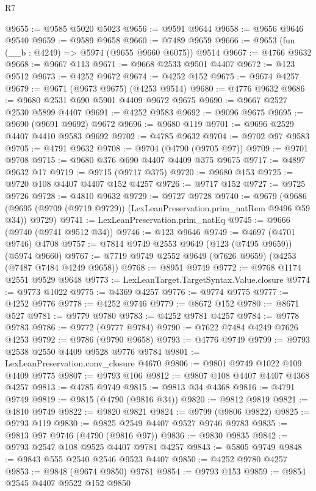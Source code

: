 \begin{lexlean}{R7}
\begin{coremodule}
@9655 := @9585 @5020 @5023
@9656 := @9591 @9644
@9658 := @9656 @9646 @9540
@9659 := @9589 @9658
@9660 := @7489 @9659
@9666 := @9653 (fun (__b : @4249) => @5974 (@9655 @9660 @6075)) @9514
@9667 := @4766 @9632
@9668 := @9667 @113
@9671 := @9668 @2533 @9501 @4407
@9672 := @123 @9512
@9673 := @4252 @9672
@9674 := @4252 @152
@9675 := @9674 @4257
@9679 := @9671 (@9673 @9675) (@4253 @9514)
@9680 := @4776 @9632
@9686 := @9680 @2531 @690 @5901 @4409 @9672 @9675
@9690 := @9667 @2527 @2530 @5899 @4407
@9691 := @4252 @9583
@9692 := @9096 @9675
@9695 := @9690 (@9691 @9692) @9672
@9696 := @9680 @119
@9701 := @9696 @2529 @4407 @4410 @9583 @9692
@9702 := @4785 @9632
@9704 := @9702 @97 @9583
@9705 := @4791 @9632
@9708 := @9704 (@4790 (@9705 @97))
@9709 := @9701 @9708
@9715 := @9680 @376 @690 @4407 @4409 @375 @9675
@9717 := @4897 @9632 @17
@9719 := @9715 (@9717 @375)
@9720 := @9680 @153
@9725 := @9720 @108 @4407 @4407 @152 @4257
@9726 := @9717 @152
@9727 := @9725 @9726
@9728 := @4810 @9632
@9729 := @9727 @9728
@9740 := @9679
    (@9686 (@9695 (@9709 (@9719 @9729)) (LexLeanPreservation.prim_natRem @9496 @59 @34)) @9729)
@9741 := LexLeanPreservation.prim_natEq
@9745 := @9666 (@9740 (@9741 @9512 @34))
@9746 := @123 @9646
@9749 := @4697 (@4701 @9746) @4708
@9757 := @7814 @9749 @2553 @9649 (@123 (@7495 @9659)) (@5974 @9660)
@9767 := @7719 @9749 @2552 @9649 (@7626 @9659) (@4253 (@7487 @7484 @4249 @9658))
@9768 := @8951 @9749
@9772 := @9768 @1174 @2551 @9529 @9648
@9773 := LexLeanTarget.TargetSyntax.Value.closure
@9774 := @9773 @1022
@9775 := @4369 @4257
@9776 := @9774 @9775
@9777 := @4252 @9776
@9778 := @4252 @9746
@9779 := @8672 @152
@9780 := @8671 @527
@9781 := @9779 @9780
@9783 := @4252 @9781 @4257
@9784 := @9778 @9783
@9786 := @9772 (@9777 @9784)
@9790 := @7622 @7484 @4249 @7626 @4253
@9792 := @9786 (@9790 @9658)
@9793 := @4776 @9749
@9799 := @9793 @2538 @2550 @4409 @9528 @9776 @9784
@9801 := LexLeanPreservation.conv_closure @4670
@9806 := @9801 @9749 @1022 @109 @4409 @9775
@9807 := @9793 @106
@9812 := @9807 @108 @4407 @4407 @4368 @4257
@9813 := @4785 @9749
@9815 := @9813 @34 @4368
@9816 := @4791 @9749
@9819 := @9815 (@4790 (@9816 @34))
@9820 := @9812 @9819
@9821 := @4810 @9749
@9822 := @9820 @9821
@9824 := @9799 (@9806 @9822)
@9825 := @9793 @119
@9830 := @9825 @2549 @4407 @9527 @9746 @9783
@9835 := @9813 @97 @9746 (@4790 (@9816 @97))
@9836 := @9830 @9835
@9842 := @9793 @2547 @108 @9525 @4407 @9781 @4257
@9843 := @5805 @9749
@9848 := @9843 @555 @2540 @2546 @9523 @4407
@9850 := @4252 @9780 @4257
@9853 := @9848 (@9674 @9850) @9781
@9854 := @9793 @153
@9859 := @9854 @2545 @4407 @9522 @152 @9850

\end{coremodule}
\end{lexlean}
